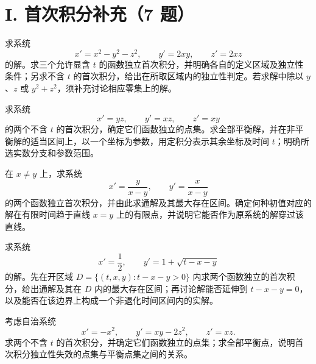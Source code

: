 \section{I. 首次积分补充（7 题）}
\noindent\begin{minipage}{\linewidth}
求系统
\[x'=x^2-y^2-z^2,\qquad y'=2xy,\qquad z'=2xz\]
的解。求三个允许显含 $t$ 的函数独立首次积分，并明确各自的定义区域及独立性条件；另求不含 $t$ 的首次积分，给出在所取区域内的独立性判定。若求解中除以 $y$、$z$ 或 $y^2+z^2$，须补充讨论相应零集上的解。
\end{minipage}\par\vspace{5pt}
\noindent\begin{minipage}{\linewidth}
求系统
\[x'=yz,\qquad y'=xz,\qquad z'=xy\]
的两个不含 $t$ 的首次积分，确定它们函数独立的点集。求全部平衡解，并在非平衡解的适当区间上，以一个坐标为参数，用定积分表示其余坐标及时间 $t$；明确所选实数分支和参数范围。
\end{minipage}\par\vspace{5pt}
\noindent\begin{minipage}{\linewidth}
在 $x\ne y$ 上，求系统
\[x'=\frac{y}{x-y},\qquad y'=\frac{x}{x-y}\]
的两个函数独立首次积分，并由此求通解及其最大存在区间。确定何种初值对应的解在有限时间趋于直线 $x=y$ 上的有限点，并说明它能否作为原系统的解穿过该直线。
\end{minipage}\par\vspace{5pt}
\noindent\begin{minipage}{\linewidth}
求系统
\[x'=\frac12,\qquad y'=1+\sqrt{t-x-y}\]
的解。先在开区域 $D=\{(t,x,y):t-x-y>0\}$ 内求两个函数独立的首次积分，给出通解及其在 $D$ 内的最大存在区间；再讨论解能否延伸到 $t-x-y=0$，以及能否在该边界上构成一个非退化时间区间内的实解。
\end{minipage}\par\vspace{5pt}
\noindent\begin{minipage}{\linewidth}
考虑自治系统
\[x'=-x^2,\qquad y'=xy-2z^2,\qquad z'=xz.\]
求两个不含 $t$ 的首次积分，并确定它们函数独立的点集；求全部平衡点，说明首次积分独立性失效的点集与平衡点集之间的关系。
\end{minipage}\par\vspace{5pt}
